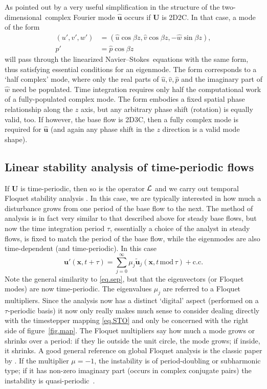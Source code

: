 \documentclass[11pt,a4paper]{report}
\newcommand\wh[1]{\widehat{#1}}
\newcommand\wt[1]{\widetilde{#1}}
\newcommand\NavSto{Navier--Stokes}
\newcommand\LNS{linearized \NavSto}
\newcommand\qp{qua\-si-per\-io\-dic}
\newcommand\twod{two-di\-men\-sion\-al}
\newcommand\Ubase{{\bm{U}}}
\newcommand\upert{{\bm{u}'}}
\newcommand\xvec{\bm{x}}
\newcommand\uvec{\bm{u}}
\newcommand\Lop{{\cal L}}
\begin{document}
As pointed out by \citet{bah96} a very useful simplification in the
structure of the \twod\ complex Fourier mode $\wh{\uvec}$ occurs if
$\Ubase$ is 2D2C.  In that case, a mode of the form
\begin{align}
(u', v', w') & =
  (\hat{u}\cos\beta z, \hat{v}\cos\beta z, -\hat{w}\sin\beta z),\\
p'         & = 
   \hat{p}\cos\beta z
\end{align}
will pass through the \LNS\ equations with the same form, thus
satisfying essential conditions for an eigenmode.  The form
corresponds to a `half complex' mode, where only the real parts of
$\hat{u}, \hat{v}, \hat{p}$ and the imaginary part of $\hat{w}$ need
be populated.  Time integration requires only half the computational
work of a fully-populated complex mode.  The form embodies a fixed
spatial phase relationship along the $z$ axis, but any arbitrary phase
shift (rotation) is equally valid, too.  If however, the base flow is
2D3C, then a fully complex mode is required for $\wh{\uvec}$ (and
again any phase shift in the $z$ direction is a valid mode shape).

\subsection{Linear stability analysis of time-periodic flows}
\label{sec.floquet}

If $\Ubase$ is time-periodic, then so is the operator $\Lop$ and we
carry out temporal Floquet stability analysis \citep[analysis of a
  linear system of ODE/PDE where the coefficients are time-periodic,
  see e.g.][]{iooss90}. In this case, we are typically interested in
how much a disturbance grows from one period of the base flow to the
next.  The method of analysis is in fact very similar to that
described above for steady base flows, but now the time integration
period $\tau$, essentially a choice of the analyst in steady flows, is
fixed to match the period of the base flow, while the eigenmodes are
also time-dependent (and time-periodic).  In this case
\begin{equation}
\upert(\xvec, t+\tau) = \sum_{j=0}^\infty
\mu_j\wt{\bm{u}}_j(\xvec,t\,\textrm{mod}\,\tau) +\text{c.c.}
\label{eq.flok}
\end{equation}
Note the general similarity to \eqref{eq.sep}, but that the
eigenvectors (or Floquet modes) are now time-periodic.  The
eigenvalues $\mu_j$ are referred to a Floquet multipliers.  Since the
analysis now has a distinct `digital' aspect (performed on a
$\tau$-periodic basis) it now only really makes much sense to consider
dealing directly with the timestepper mapping \eqref{eq.STO} and only
be concerned with the right side of figure~\ref{fig.map}.  The Floquet
multipliers say how much a mode grows or shrinks over a period: if
they lie outside the unit circle, the mode grows; if inside, it
shrinks.  A good general reference on global Floquet analysis is the
classic paper by \citet{bah96}.  If the multiplier $\mu=-1$, the
instability is of period-doubling or subharmonic type; if it has
non-zero imaginary part (occurs in complex conjugate pairs) the
instability is \qp\ \citep{bllo03b}.
\end{document}
